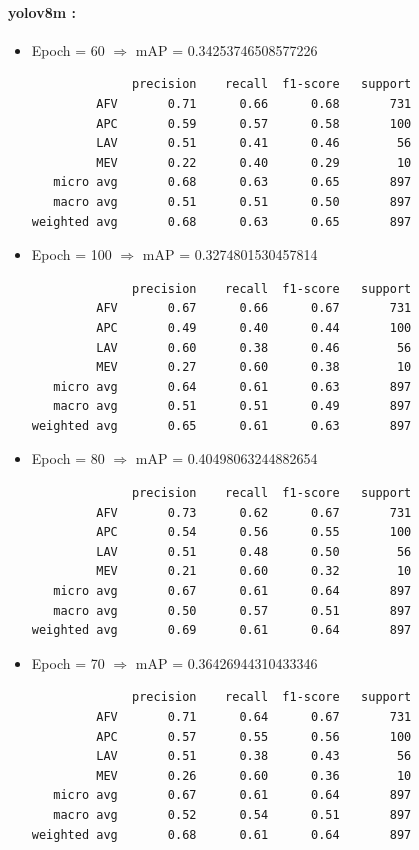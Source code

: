 \paragraph{yolov8m :}
\begin{itemize}
    \item Epoch = 60 $\Rightarrow$ mAP = 0.34253746508577226
          \begin{verbatim}
              precision    recall  f1-score   support
         AFV       0.71      0.66      0.68       731
         APC       0.59      0.57      0.58       100
         LAV       0.51      0.41      0.46        56
         MEV       0.22      0.40      0.29        10
   micro avg       0.68      0.63      0.65       897
   macro avg       0.51      0.51      0.50       897
weighted avg       0.68      0.63      0.65       897
    \end{verbatim}

    \item Epoch = 100 $\Rightarrow$ mAP = 0.3274801530457814
          \begin{verbatim}
              precision    recall  f1-score   support
         AFV       0.67      0.66      0.67       731
         APC       0.49      0.40      0.44       100
         LAV       0.60      0.38      0.46        56
         MEV       0.27      0.60      0.38        10
   micro avg       0.64      0.61      0.63       897
   macro avg       0.51      0.51      0.49       897
weighted avg       0.65      0.61      0.63       897
    \end{verbatim}

    \item Epoch = 80 $\Rightarrow$ mAP = 0.40498063244882654
          \begin{verbatim}
              precision    recall  f1-score   support
         AFV       0.73      0.62      0.67       731
         APC       0.54      0.56      0.55       100
         LAV       0.51      0.48      0.50        56
         MEV       0.21      0.60      0.32        10
   micro avg       0.67      0.61      0.64       897
   macro avg       0.50      0.57      0.51       897
weighted avg       0.69      0.61      0.64       897
    \end{verbatim}

    \item Epoch = 70 $\Rightarrow$ mAP = 0.36426944310433346
          \begin{verbatim}
              precision    recall  f1-score   support
         AFV       0.71      0.64      0.67       731
         APC       0.57      0.55      0.56       100
         LAV       0.51      0.38      0.43        56
         MEV       0.26      0.60      0.36        10
   micro avg       0.67      0.61      0.64       897
   macro avg       0.52      0.54      0.51       897
weighted avg       0.68      0.61      0.64       897
    \end{verbatim}


\end{itemize}
